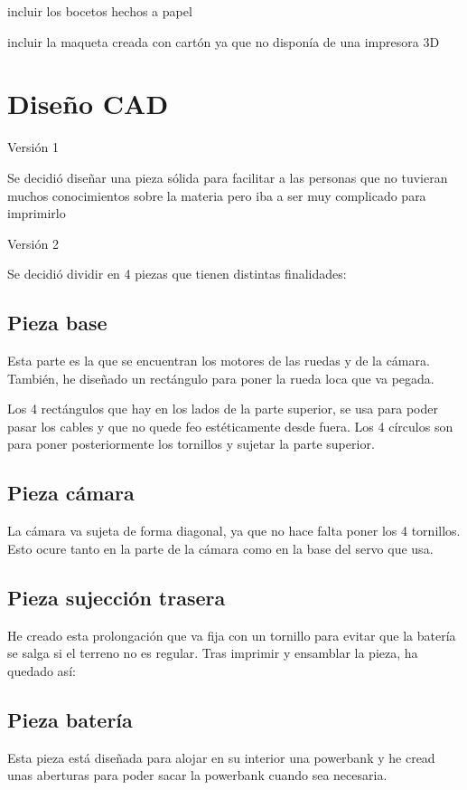 incluir los bocetos hechos a papel

incluir la maqueta creada con cartón ya que no disponía de una impresora 3D

\section{Diseño CAD}

Versión 1 

Se decidió diseñar una pieza sólida para facilitar a las personas que no tuvieran muchos conocimientos sobre la materia pero iba a ser muy complicado para imprimirlo

Versión 2

Se decidió dividir en 4 piezas que tienen distintas finalidades:

\subsection{Pieza base}
Esta parte es la que se encuentran los motores de las ruedas y de la cámara. También, he diseñado un rectángulo para poner la rueda loca que va pegada.

Los 4 rectángulos que hay en los lados de la parte superior, se usa para poder pasar los cables y que no quede feo estéticamente desde fuera. Los 4 círculos son para poner posteriormente los tornillos y sujetar la parte superior.

\subsection{Pieza cámara}
La cámara va sujeta de forma diagonal, ya que no hace falta poner los 4 tornillos. Esto ocure tanto en la parte de la cámara como en la base del servo que usa.


\subsection{Pieza sujección trasera}
He creado esta prolongación que va fija con un tornillo para evitar que la batería se salga si el terreno no es regular. Tras imprimir y ensamblar la pieza, ha quedado así:

\subsection{Pieza batería}

Esta pieza está diseñada para alojar en su interior una powerbank y he cread unas aberturas para poder sacar la powerbank cuando sea necesaria.

